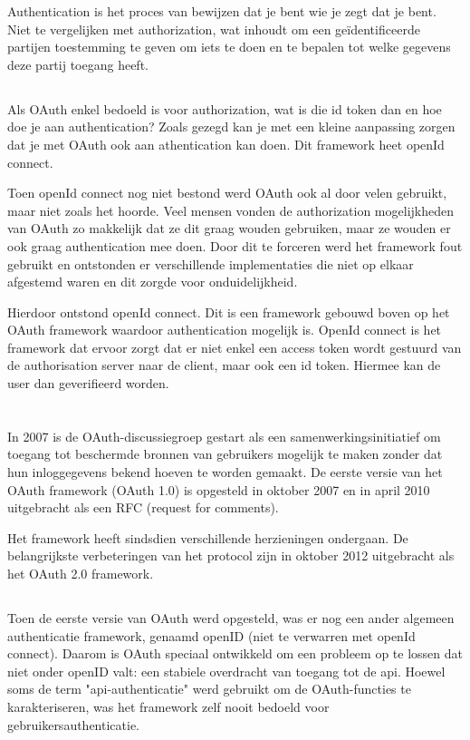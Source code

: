 Authentication is het proces van bewijzen dat je bent wie je zegt dat je bent. Niet te vergelijken met authorization, wat inhoudt om een geïdentificeerde partijen toestemming te geven om iets te doen en te bepalen tot welke gegevens deze partij toegang heeft.

\subsection{}
Als OAuth enkel bedoeld is voor authorization, wat is die id token dan en hoe doe je aan authentication? Zoals gezegd kan je met een kleine aanpassing zorgen dat je met OAuth ook aan athentication kan doen. Dit framework heet openId connect.

Toen openId connect nog niet bestond werd OAuth ook al door velen gebruikt, maar niet zoals het hoorde. Veel mensen vonden de authorization mogelijkheden van OAuth zo makkelijk dat ze dit graag wouden gebruiken, maar ze wouden er ook graag authentication mee doen. Door dit te forceren werd het framework fout gebruikt en ontstonden er verschillende implementaties die niet op elkaar afgestemd waren en dit zorgde voor onduidelijkheid.

Hierdoor ontstond openId connect. Dit is een framework gebouwd boven op het OAuth framework waardoor authentication mogelijk is. OpenId connect is het framework dat ervoor zorgt dat er niet enkel een access token wordt gestuurd van de authorisation server naar de client, maar ook een id token. Hiermee kan de user dan geverifieerd worden.

\section{}
\label{sec:OAuthHistory}
In 2007 is de OAuth-discussiegroep gestart als een samenwerkingsinitiatief om toegang tot beschermde bronnen van gebruikers mogelijk te maken zonder dat hun inloggegevens bekend hoeven te worden gemaakt. De eerste versie van het OAuth framework (OAuth 1.0) is opgesteld in oktober 2007 en in april 2010 uitgebracht als een RFC (request for comments).

Het framework heeft sindsdien verschillende herzieningen ondergaan. De belangrijkste verbeteringen van het protocol zijn in oktober 2012 uitgebracht als het OAuth 2.0 framework.

\subsection{}
Toen de eerste versie van OAuth werd opgesteld, was er nog een ander algemeen authenticatie framework, genaamd openID (niet te verwarren met openId connect). Daarom is OAuth speciaal ontwikkeld om een probleem op te lossen dat niet onder openID valt: een stabiele overdracht van toegang tot de api. Hoewel soms de term "api-authenticatie" werd gebruikt om de OAuth-functies te karakteriseren, was het framework zelf nooit bedoeld voor gebruikersauthenticatie.

